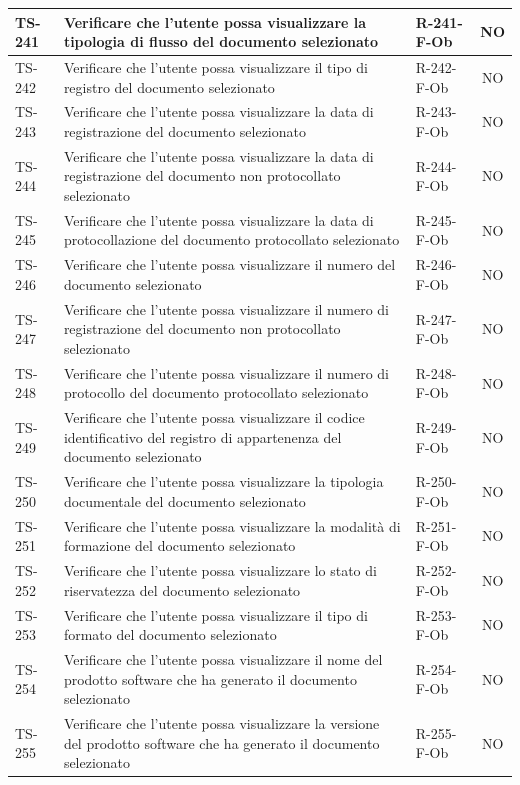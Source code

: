 \documentclass[a4paper,12pt]{article}
\begin{document}
\begin{longtable}{|p{1.5cm}|p{8.3cm}|p{2.4cm}|c|}
\hline
TS-241 & Verificare che l'utente possa visualizzare la tipologia di flusso del documento selezionato & R-241-F-Ob & NO \\
\hline
TS-242 & Verificare che l'utente possa visualizzare il tipo di registro del documento selezionato & R-242-F-Ob & NO \\
\hline
TS-243 & Verificare che l'utente possa visualizzare la data di registrazione del documento selezionato & R-243-F-Ob & NO \\
\hline
TS-244 & Verificare che l'utente possa visualizzare la data di registrazione del documento non protocollato selezionato & R-244-F-Ob & NO \\
\hline
TS-245 & Verificare che l'utente possa visualizzare la data di protocollazione del documento protocollato selezionato & R-245-F-Ob & NO \\
\hline
TS-246 & Verificare che l'utente possa visualizzare il numero del documento selezionato & R-246-F-Ob & NO \\
\hline
TS-247 & Verificare che l'utente possa visualizzare il numero di registrazione del documento non protocollato selezionato & R-247-F-Ob & NO \\
\hline
TS-248 & Verificare che l'utente possa visualizzare il numero di protocollo del documento protocollato selezionato & R-248-F-Ob & NO \\
\hline
TS-249 & Verificare che l'utente possa visualizzare il codice identificativo del registro di appartenenza del documento selezionato & R-249-F-Ob & NO \\
\hline
TS-250 & Verificare che l'utente possa visualizzare la tipologia documentale del documento selezionato & R-250-F-Ob & NO \\
\hline
TS-251 & Verificare che l'utente possa visualizzare la modalità di formazione del documento selezionato & R-251-F-Ob & NO \\
\hline
TS-252 & Verificare che l'utente possa visualizzare lo stato di riservatezza del documento selezionato & R-252-F-Ob & NO \\
\hline
TS-253 & Verificare che l'utente possa visualizzare il tipo di formato del documento selezionato & R-253-F-Ob & NO \\
\hline
TS-254 & Verificare che l'utente possa visualizzare il nome del prodotto software che ha generato il documento selezionato & R-254-F-Ob & NO \\
\hline
TS-255 & Verificare che l'utente possa visualizzare la versione del prodotto software che ha generato il documento selezionato & R-255-F-Ob & NO \\

\end{longtable}
\end{document}
